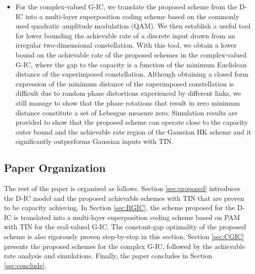\documentclass[12pt, draftclsnofoot, onecolumn]{IEEEtran}
\theoremstyle{definition}
\begin{document}
\begin{itemize}
\item For the complex-valued G-IC, we translate the proposed scheme from the D-IC into a multi-layer superposition coding scheme based on the commonly used quadratic amplitude modulation (QAM). We then establish a useful tool for lower bounding the achievable rate of a discrete input drawn from an irregular two-dimensional constellation. With this tool, we obtain a lower bound on the achievable rate of the proposed schemes in the complex-valued G-IC, where the gap to the capacity is a function of the minimum Euclidean distance of the superimposed constellation. Although obtaining a closed form expression of the minimum distance of the superimposed constellation is difficult due to random phase distortions experienced by different links, we still manage to show that the phase rotations that result in zero minimum distance constitute a set of Lebesgue measure zero. Simulation results are provided to show that the proposed scheme can operate close to the capacity outer bound \cite{4675741} and the achievable rate region of the Gaussian HK scheme \cite{4675741} and it significantly outperforms Gaussian inputs with TIN.

\end{itemize}

\subsection{Paper Organization}
The rest of the paper is organized as follows. Section \ref{sec:proposed} introduces the D-IC model and the proposed achievable schemes with TIN that are proven to be capacity achieving. In Section \ref{sec:RGIC}, the scheme proposed for the D-IC is translated into a multi-layer superposition coding scheme based on PAM with TIN for the real-valued G-IC. The constant-gap optimality of the proposed scheme is also rigorously proven step-by-step in this section. Section \ref{sec:CGIC} presents the proposed schemes for the complex G-IC, followed by the achievable rate analysis and simulations. Finally, the paper concludes in Section \ref{sec:conclude}.
\end{document}
